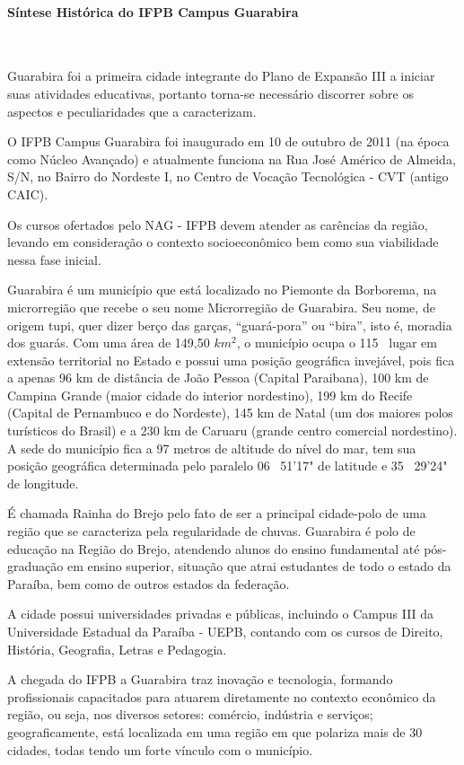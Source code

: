 \paragraph{S\'intese Hist\'orica do IFPB Campus Guarabira}\

	Guarabira foi a primeira cidade integrante do Plano de Expansão III a iniciar suas atividades educativas, portanto torna-se necessário discorrer sobre os aspectos e peculiaridades que a caracterizam.

	O IFPB Campus Guarabira foi inaugurado em 10 de outubro de 2011 (na \'epoca como N\'ucleo Avan\c{c}ado) e atualmente funciona na Rua José Américo de Almeida, S/N, no Bairro do Nordeste I, no Centro de Vocação Tecnológica - CVT (antigo CAIC).

	Os cursos ofertados pelo NAG - IFPB devem atender as carências da região, levando em consideração o contexto socioeconômico bem como sua viabilidade nessa fase inicial.

	Guarabira é um município que está localizado no Piemonte da Borborema, na microrregião que recebe o seu nome Microrregião de Guarabira. Seu nome, de origem tupi, quer dizer berço das garças, ``guará-pora'' ou ``bira'', isto é, moradia dos guarás. Com uma área de 149,50 $km^2$, o município ocupa o 115~{\degree} lugar em extensão territorial no Estado e possui uma posição geográfica invejável, pois fica a apenas 96 km de distância de João Pessoa (Capital Paraibana), 100 km de Campina Grande (maior cidade do interior nordestino), 199 km do Recife (Capital de Pernambuco e do Nordeste), 145 km de Natal (um dos maiores polos turísticos do Brasil) e a 230 km de Caruaru (grande centro comercial nordestino). A sede do município fica a 97 metros de altitude do nível do mar, tem sua posição geográfica determinada pelo paralelo 06~{\degree} 51’17" de latitude e 35~{\degree} 29’24" de longitude.

	É chamada Rainha do Brejo pelo fato de ser a principal cidade-polo de uma região que se caracteriza pela regularidade de chuvas. Guarabira é polo de educação na Região do Brejo, atendendo alunos do ensino fundamental até pós-graduação em ensino superior, situação que atrai estudantes de todo o estado da Paraíba, bem como de outros estados da federação.

	A cidade possui universidades privadas e públicas, incluindo o Campus III da Universidade Estadual da Paraíba - UEPB, contando com os cursos de Direito, História, Geografia, Letras e Pedagogia.

	A chegada do IFPB a Guarabira traz inovação e tecnologia, formando profissionais capacitados para atuarem diretamente no contexto econômico da região, ou seja, nos diversos setores: comércio, indústria e serviços; geograficamente, está localizada em uma região em que polariza mais de 30 cidades, todas tendo um forte vínculo com o município.

